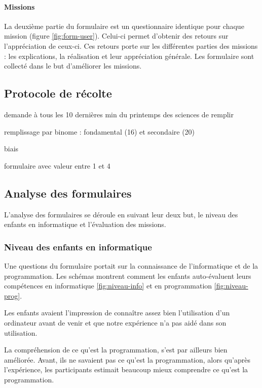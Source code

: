 \paragraph{Missions}
La deuxième partie du formulaire est un questionnaire identique pour chaque \gls{mission} (figure \ref{fig:form-user}). Celui-ci permet d'obtenir des retours sur l'appréciation de ceux-ci. Ces retours porte sur les différentes parties des \glspl{mission} : les explications, la réalisation et leur appréciation générale. Les formulaire sont collecté dans le but d'améliorer les \glspl{mission}.

\subsection{Protocole de récolte}
demande à tous les 10 dernières min du printemps des sciences de remplir

remplissage par binome : \gls{fondamental} (16) et \gls{secondaire} (20)

biais

formulaire avec valeur entre 1 et 4

\subsection{Analyse des formulaires}
L'analyse des formulaires se déroule en suivant leur deux but, le niveau des enfants en informatique et l'évaluation des \glspl{mission}.

\subsubsection{Niveau des enfants en informatique}
Une questions du formulaire portait sur la connaissance de l'informatique et de la programmation. Les schémas montrent comment les enfants auto-évaluent leurs compétences en informatique \ref{fig:niveau-info} et en programmation \ref{fig:niveau-prog}.

Les enfants avaient l'impression de connaître assez bien l'utilisation d'un ordinateur avant de venir et que notre expérience n'a pas aidé dans son utilisation.

La compréhension de ce qu'est la programmation, s'est par ailleurs bien améliorée. Avant, ils ne savaient pas ce qu'est la programmation, alors qu'après l'expérience, les participants estimait beaucoup mieux comprendre ce qu'est la programmation. %


